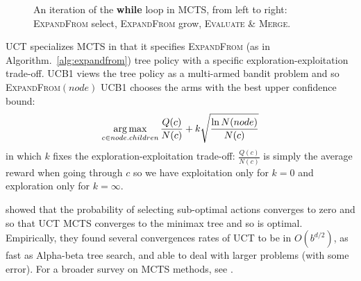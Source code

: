 \begin{figure}
\begin{center}
\hspace{1cm}
\caption{An iteration of the \textbf{while} loop in MCTS, from left to right:
\textsc{ExpandFrom} select, \textsc{ExpandFrom} grow, \textsc{Evaluate} \& \textsc{Merge}.}
\label{fig:MCTS}
\end{center}
\end{figure}

UCT specializes MCTS in that it specifies \textsc{ExpandFrom} (as in Algorithm.~\ref{alg:expandfrom}) tree policy with a specific exploration-exploitation trade-off. UCB1 \citep{BanditBased} views the tree policy as a multi-armed bandit problem and so \textsc{ExpandFrom}$(node)$ UCB1 chooses the arms with the best upper confidence bound: $$\operatorname*{arg\,max}_{c \in node.children} \frac{Q(c)}{N(c)}+k\sqrt{\frac{\ln N(node)}{N(c)}}$$ in which $k$ fixes the exploration-exploitation trade-off: $\frac{Q(c)}{N(c)}$ is simply the average reward when going through $c$ so we have exploitation only for $k=0$ and exploration only for $k=\infty$.

\citet{BanditBased} showed that the probability of selecting sub-optimal actions converges to zero and so that UCT MCTS converges to the minimax tree and so is optimal. Empirically, they found several convergences rates of UCT to be in $O(b^{d/2})$, as fast as Alpha-beta tree search, and able to deal with larger problems (with some error). For a broader survey on MCTS methods, see \citep{MCTSsurvey}.

